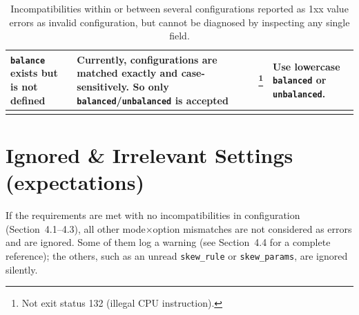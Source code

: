 \documentclass[a4paper,11pt]{article}
\newcommand{\vcode}[1]{\textcolor{valred}{\bfseries\ttfamily #1}}
\begin{document}
\begin{longtable}{@{}L{3.4cm} L{4.6cm} L{1.2cm} L{6.4cm}@{}}
\texttt{balance} exists but is not defined & Currently, configurations are matched exactly and case-sensitively. So only \texttt{balanced}/\texttt{unbalanced} is accepted & \vcode{132}\footnote{Not exit status 132 (illegal CPU instruction).} & Use lowercase \texttt{balanced} or \texttt{unbalanced}. \\
\bottomrule
\caption{Incompatibilities within or between several configurations reported as 1xx value errors as invalid configuration, but cannot be diagnosed by inspecting any single field.}
\end{longtable}
\label{1xx-shorttable}

\newpage

\section{Ignored \& Irrelevant Settings (expectations)}
If the requirements are met with no incompatibilities in configuration (Section~4.1--4.3), all other mode$\times$option mismatches are not considered as errors and are ignored. Some of them log a warning (see Section~4.4 for a complete reference); the others, such as an unread \texttt{skew\_rule} or \texttt{skew\_params}, are ignored silently.
\end{document}
